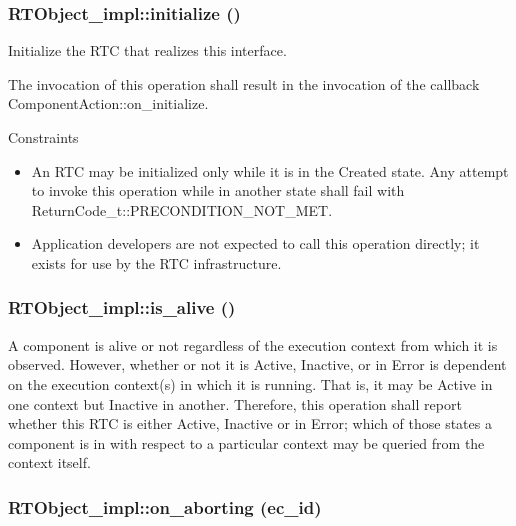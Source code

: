\subsubsection{\setlength{\rightskip}{0pt plus 5cm}RTObject\_\-impl::initialize ()}\label{classRTObject__impl_RTObject__impla13}


Initialize the RTC that realizes this interface.

The invocation of this operation shall result in the invocation of the callback Component\-Action::on\_\-initialize.

Constraints\begin{itemize}
\item An RTC may be initialized only while it is in the Created state. Any attempt to invoke this operation while in another state shall fail with Return\-Code\_\-t::PRECONDITION\_\-NOT\_\-MET.\item Application developers are not expected to call this operation directly; it exists for use by the RTC infrastructure.\end{itemize}
\subsubsection{\setlength{\rightskip}{0pt plus 5cm}RTObject\_\-impl::is\_\-alive ()}\label{classRTObject__impl_RTObject__impla16}


A component is alive or not regardless of the execution context from which it is observed. However, whether or not it is Active, Inactive, or in Error is dependent on the execution context(s) in which it is running. That is, it may be Active in one context but Inactive in another. Therefore, this operation shall report whether this RTC is either Active, Inactive or in Error; which of those states a component is in with respect to a particular context may be queried from the context itself. 

\subsubsection{\setlength{\rightskip}{0pt plus 5cm}RTObject\_\-impl::on\_\-aborting (ec\_\-id)}\label{classRTObject__impl_RTObject__impla30}


